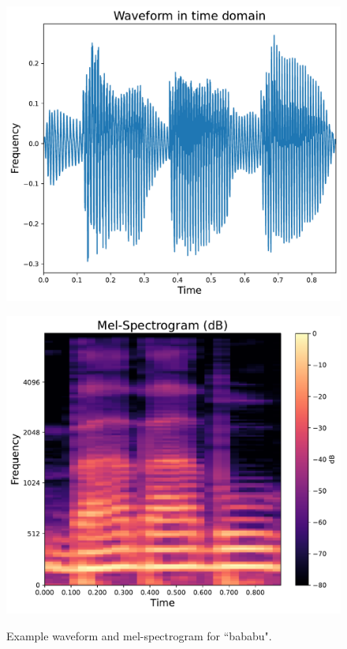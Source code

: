 \begin{figure}[h]
	\centering
	\begin{minipage}[b]{0.4\linewidth}
		\includegraphics[width=\linewidth]{"graphs/sectr_example/Waveform in time domain"}
		\label{fig:waveform-in-time-domain}
	\end{minipage}
	\hfill
	\begin{minipage}[b]{0.4\linewidth}
		\includegraphics[width=\linewidth]{"graphs/sectr_example/Mel-Spectrogram (dB)"}
		\label{fig:mel-spectrogram-db}
	\end{minipage}
	\caption{Example waveform and mel-spectrogram for ``bababu".}
	\label{fig:example_mel_bababu}
\end{figure}
